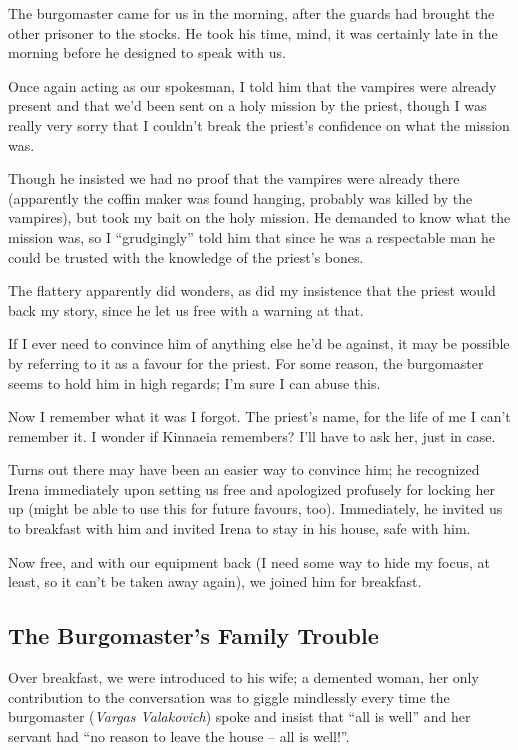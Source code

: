 
The burgomaster came for us in the morning, after the guards had brought the other prisoner to the stocks. He took his time, mind, it was certainly late in the morning before he designed to speak with us.

Once again acting as our spokesman, I told him that the vampires were already present and that we'd been sent on a holy mission by the priest, though I was really very sorry that I couldn't break the priest's confidence on what the mission was.

Though he insisted we had no proof that the vampires were already there (apparently the coffin maker was found hanging, probably was killed by the vampires), but took my bait on the holy mission. He demanded to know what the mission was, so I ``grudgingly'' told him that since he was a respectable man he could be trusted with the knowledge of the priest's bones.

The flattery apparently did wonders, as did my insistence that the priest would back my story, since he let us free with a warning at that.

If I ever need to convince him of anything else he'd be against, it may be possible by referring to it as a favour for the priest. For some reason, the burgomaster seems to hold him in high regards; I'm sure I can abuse this.

Now I remember what it was I forgot. The priest's name, for the life of me I can't remember it. I wonder if Kinnaeia remembers? I'll have to ask her, just in case. 

Turns out there may have been an easier way to convince him; he recognized Irena immediately upon setting us free and apologized profusely for locking her up (might be able to use this for future favours, too). Immediately, he invited us to breakfast with him and invited Irena to stay in his house, safe with him.

Now free, and with our equipment back (I need some way to hide my focus, at least, so it can't be taken away again), we joined him for breakfast.

\subsection*{The Burgomaster's Family Trouble}
Over breakfast, we were introduced to his wife; a demented woman, her only contribution to the conversation was to giggle mindlessly every time the burgomaster (\emph{Vargas Valakovich}) spoke and insist that ``all is well'' and her servant had ``no reason to leave the house -- all is well!''.

